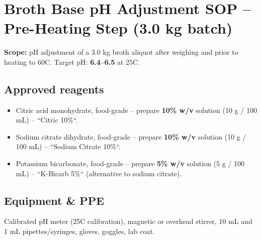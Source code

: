
\section*{Broth Base pH Adjustment SOP -- Pre-Heating Step (3.0 kg batch)}

\textbf{Scope:} pH adjustment of a 3.0 kg broth aliquot after weighing and prior to heating to 60\textdegree C. Target pH: \textbf{6.4--6.5} at 25\textdegree C.

\subsection*{Approved reagents}
\begin{itemize}[noitemsep,leftmargin=*]
  \item Citric acid monohydrate, food-grade -- prepare \textbf{10\% w/v} solution (10 g / 100 mL) -- ``Citric 10\%``.
  \item Sodium citrate dihydrate, food-grade -- prepare \textbf{10\% w/v} solution (10 g / 100 mL) -- ``Sodium Citrate 10\%``.
  \item Potassium bicarbonate, food-grade -- prepare \textbf{5\% w/v} solution (5 g / 100 mL) -- ``K-Bicarb 5\%`` (alternative to sodium citrate).
\end{itemize}

\subsection*{Equipment \& PPE}
Calibrated pH meter (25\textdegree C calibration), magnetic or overhead stirrer, 10 mL and 1 mL pipettes/syringes, gloves, goggles, lab coat.

